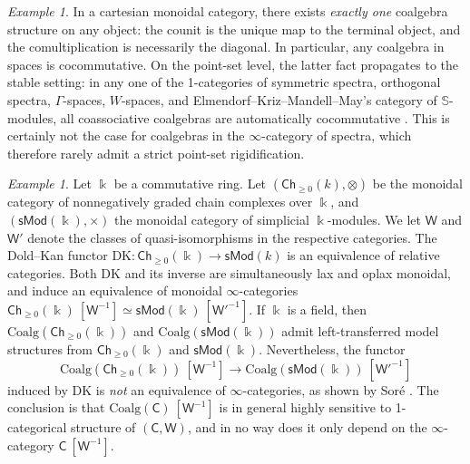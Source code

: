 \documentclass[a4paper,12pt]{amsart}
\theoremstyle{plain}
\theoremstyle{definition}
\theoremstyle{remark}
\newtheorem{example}[theorem]{\sc Example}%
\newcommand{\kk}{\Bbbk}
\begin{document}
\begin{example}In a cartesian monoidal category, there exists \emph{exactly one} coalgebra structure on any object: the counit is the unique map to the terminal object, and the comultiplication is necessarily the diagonal. In particular, any coalgebra in spaces is cocommutative. On the point-set level, the latter fact propagates to the stable setting: in any one of the 1-categories of symmetric spectra, orthogonal spectra, $\Gamma$-spaces, $W$-spaces, and Elmendorf--Kriz--Mandell--May's category of $\mathbb S$-modules, all coassociative coalgebras are automatically cocommutative \cite{ps}. This is certainly not the case for coalgebras in the $\infty$-category of spectra, which therefore rarely admit a strict point-set rigidification.
\end{example}


\begin{example}
	Let $\kk$ be a commutative ring. Let $(\mathsf{Ch}_{\geq 0}(k),\otimes)$ be the monoidal category of nonnegatively graded chain complexes over $\kk$, and $(\mathsf{sMod}(\kk),\times)$ the monoidal category of simplicial $\kk$-modules. We let $\mathsf W$ and $\mathsf W'$ denote the classes of quasi-isomorphisms in the respective categories. The Dold--Kan functor 
	$\mathrm{DK} : \mathsf{Ch}_{\geq 0}(\kk) \longrightarrow \mathsf{sMod}(k)$
	is an equivalence of relative categories. Both $\mathrm{DK}$ and its inverse are simultaneously lax and oplax monoidal, and induce an equivalence of monoidal $\infty$-categories $\mathsf{Ch}_{\geq 0}(\kk)~[\mathsf W^{-1}] \simeq \mathsf{sMod}(\kk)~[\mathsf W'^{-1}]$. If $\kk$ is a field, then $\mathrm{Coalg}(\mathsf{Ch}_{\geq 0}(\kk))$ and $\mathrm{Coalg}(\mathsf{sMod}(\kk))$ admit left-transferred model structures from $\mathsf{Ch}_{\geq 0}(\kk)$ and $\mathsf{sMod}(\kk)$. Nevertheless, the  functor 
	\[ \mathrm{Coalg}(\mathsf{Ch}_{\geq 0}(\kk))~[\mathsf W^{-1}] \longrightarrow \mathrm{Coalg}(\mathsf{sMod}(\kk))~[\mathsf W'^{-1}]\]
	induced by $\mathrm{DK}$ is \emph{not} an equivalence of $\infty$-categories, as shown by Sor\'e \cite{sore}. The conclusion is that $\mathrm{Coalg}(\mathsf C)~[\mathsf W^{-1}]$ is in general highly sensitive to 1-categorical structure of $(\mathsf C,\mathsf W)$, and in no way does it only depend on the $\infty$-category $\mathsf C~[\mathsf W^{-1}]$. 
\end{example}
\end{document}
